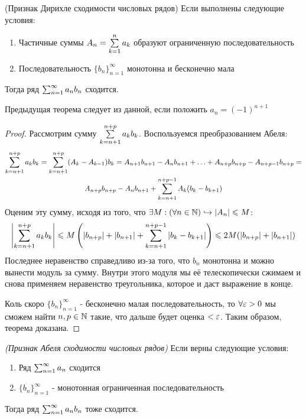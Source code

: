 \begin{theorem} (Признак Дирихле сходимости числовых рядов)
	Если выполнены следующие условия:
	\begin{enumerate}
		\item Частичные суммы $A_n = \sum\limits_{k = 1}^n a_k$ образуют ограниченную последовательность
		
		\item Последовательность $\{b_n\}_{n = 1}^\infty$ монотонна и бесконечно мала
	\end{enumerate}
	Тогда ряд $\sum_{n = 1}^\infty a_n b_n$ сходится.
\end{theorem}

\begin{note}
	Предыдущая теорема следует из данной, если положить $a_n = (-1)^{n + 1}$
\end{note}

\begin{proof}
	Рассмотрим сумму $\sum\limits_{k = n + 1}^{n + p} a_k b_k$. Воспользуемся преобразованием Абеля:
	\begin{multline*}
		\sum\limits_{k = n + 1}^{n + p} a_k b_k = \sum\limits_{k = n + 1}^{n + p} (A_k - A_{k - 1}) b_k = A_{n + 1} b_{n + 1} - A_n b_{n + 1} + \ldots + A_{n + p} b_{n + p} - A_{n + p - 1} b_{n + p} =
		\\
		A_{n + p} b_{n + p} - A_n b_{n + 1} + \sum\limits_{k = n + 1}^{n + p - 1} A_k (b_k - b_{k + 1})
	\end{multline*}
	Оценим эту сумму, исходя из того, что $\exists M : (\forall n \in \mathbb{N})\hookrightarrow |A_n| \leqslant M$:
	\[
		\left|\sum\limits_{k = n + 1}^{n + p} a_k b_k\right| \leqslant M \left(|b_{n + p}| + |b_{n + 1}| + \sum\limits_{k = n + 1}^{n + p - 1} |b_k - b_{k + 1}|\right) \leqslant 2M (|b_{n + p}| + |b_{n + 1}|)
	\]
	Последнее неравенство справедливо из-за того, что $b_n$ монотонна и можно вынести модуль за сумму. Внутри этого модуля мы её телескопически сжимаем и снова применяем неравенство треугольника, которое и даст выражение в конце.
	
	Коль скоро $\{b_n\}_{n = 1}^\infty$ - бесконечно малая последовательность, то $\forall \varepsilon > 0$ мы сможем найти $n, p \in \mathbb{N}$ такие, что дальше будет оценка $< \varepsilon$. Таким образом, теорема доказана.
\end{proof}

\begin{corollary} \textit{(Признак Абеля сходимости числовых рядов)}
	Если верны следующие условия:
	\begin{enumerate}
		\item Ряд $\sum_{n = 1}^\infty a_n$ сходится
		
		\item $\{b_n\}_{n = 1}^\infty$ - монотонная ограниченная последовательность
	\end{enumerate}
	Тогда ряд $\sum_{n = 1}^\infty a_n b_n$ тоже сходится.
\end{corollary}

